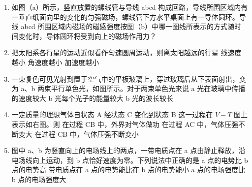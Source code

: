 \documentclass[\gkver]{gaokaozhenti}
\begin{document}
\begin{enumerate}
\item
如图（a）所示，竖直放置的螺线管与导线 abcd 构成回路，导线所围区域内有一垂直纸面向里的变化的匀强磁场，螺线管下方水平桌面上有一导体圆环。导线 abcd 所围区域内磁场的磁感强度按图（b）中哪一图线所表示的方式随时间变化时，导体圆环将受到向上的磁场作用力？
\onepicture[w=12.00cm]{}

\item
把太阳系各行星的运动近似看作匀速圆周运动，则离太阳越远的行星
{线速度越小}
{角速度越小}
{加速度越小}

\item
一束复色可见光射到置于空气中的平板玻璃上，穿过玻璃后从下表面射出，变为 a、b 两束平行单色光，如图所示。对于两束单色光来说
\onepicture[w=3.34cm]{}
{a 光在玻璃中传播的速度较大}
{b 光每个光子的能量较大}
{b 光的波长较长}

\item
一定质量的理想气体自状态 A 经状态 C 变化到状态 B 这一过程在 $V-T$ 图上表示如右图。则
\onepicture[w=3.46cm]{}
{在过程 CB 中，外界对气体做功}
{在过程 AC 中，气体压强不断变大}
{在过程 CB 中，气体压强不断变小}

\item
图中 a、b 为竖直向上的电场线上的两点，一带电质点在 a 点由静止释放，沿电场线向上运动，到 b 点恰好速度为零。下列说法中正确的是
\onepicture[h=4.50cm]{}
{a 点的电势比 b 点的电势高}
{带电质点在 a 点的电势能比在 b 点的电势能小}
{a 点的电场强度比 b 点的电场强度大}


\end{enumerate}
\end{document}
